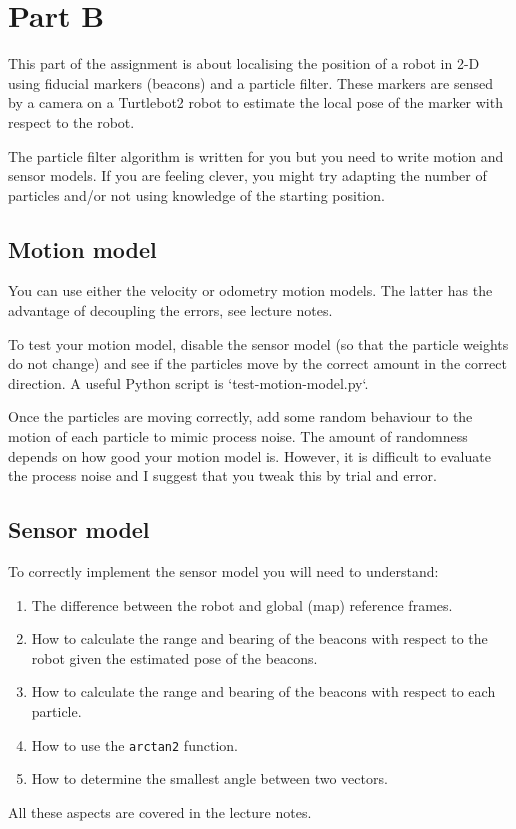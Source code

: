 \documentclass[a4paper, 12]{article}
\newcommand{\code}[1]{\texttt{#1}}
\begin{document}
\section{Part B}

This part of the assignment is about localising the position of a
robot in 2-D using fiducial markers (beacons) and a particle filter.
These markers are sensed by a camera on a Turtlebot2 robot to estimate
the local pose of the marker with respect to the robot.


The particle filter algorithm is written for you but you need to write
motion and sensor models.  If you are feeling clever, you might try
adapting the number of particles and/or not using knowledge of the
starting position.


\subsection{Motion model}

You can use either the velocity or odometry motion models.  The latter
has the advantage of decoupling the errors, see lecture notes.

To test your motion model, disable the sensor model (so that the
particle weights do not change) and see if the particles move by the
correct amount in the correct direction.  A useful Python script is
`test-motion-model.py`.

Once the particles are moving correctly, add some random behaviour to
the motion of each particle to mimic process noise.  The amount of
randomness depends on how good your motion model is.  However, it is
difficult to evaluate the process noise and I suggest that you tweak
this by trial and error.


\subsection{Sensor model}


To correctly implement the sensor model you will need to understand:
%
\begin{enumerate}
\item The difference between the robot and global (map) reference frames.

\item How to calculate the range and bearing of the beacons with
  respect to the robot given the estimated pose of the beacons.

\item How to calculate the range and bearing of the beacons with
  respect to each particle.

\item How to use the \code{arctan2} function.

\item How to determine the smallest angle between two vectors.  
\end{enumerate}
%
All these aspects are covered in the lecture notes.
\end{document}
